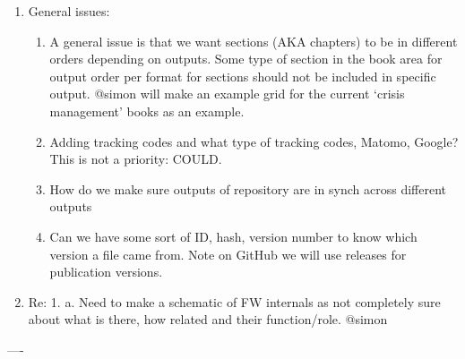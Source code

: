 \documentclass{article}
\begin{document}
\begin{enumerate}
\begin{enumerate}
\end{enumerate}

\item General issues:

\begin{enumerate}
\item A general issue is that we want sections (AKA chapters) to be in different orders depending on outputs. Some type of section in the book area for output order per format for sections should not be included in specific output. @simon will make an example grid for the current ‘crisis management’ books as an example.


\item Adding tracking codes and what type of tracking codes, Matomo, Google? This is not a priority: COULD.


\item How do we make sure outputs of repository are in synch across different outputs


\item Can we have some sort of ID, hash, version number to know which version a file came from. Note on GitHub we will use releases for publication versions.


\end{enumerate}

\item Re: 1. a. Need to make a schematic of FW internals as not completely sure about what is there, how related and their function/role. @simon


\end{enumerate}

----
\end{document}
